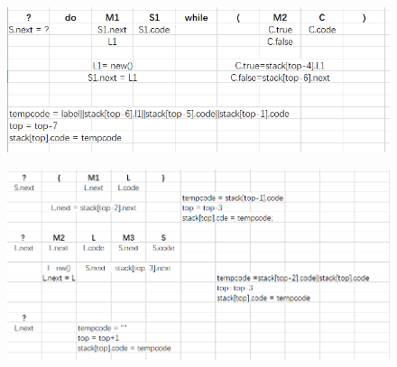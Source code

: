 \documentclass[a4paper, 10pt]{article}
\begin{document}
\begin{figure}[H]
\centering
\includegraphics[scale=0.6]{chapter5_hw3_5}
\end{figure}

\begin{figure}[H]
\centering
\includegraphics[scale=0.6]{chapter5_hw3_6}
\end{figure}
\end{document}
